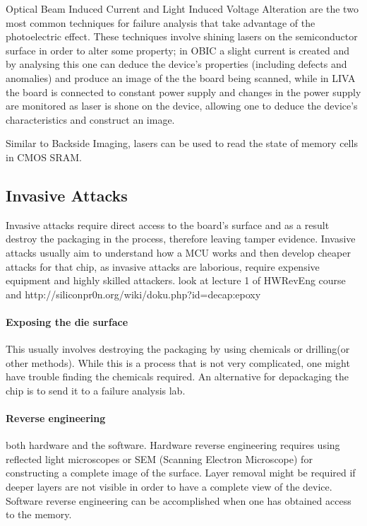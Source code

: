 	Optical Beam Induced Current and Light Induced Voltage Alteration are the two most common techniques for failure analysis that take advantage of the photoelectric effect. These techniques involve shining lasers on the semiconductor surface in order to alter some property; in OBIC a slight current is created and by analysing this one can deduce the device's properties (including defects and anomalies) and produce an image of the the board being scanned, while in LIVA the board is connected to constant power supply and changes in the power supply are monitored as laser is shone on the device, allowing one to deduce the device's characteristics and construct an image\citep{cole:OBIC}.
	
	Similar to Backside Imaging, lasers can be used to read the state of memory cells in CMOS SRAM.
	
	\subsection{Invasive Attacks}
	Invasive attacks require direct access to the board's surface and as a result destroy the packaging in the process, therefore leaving tamper evidence. Invasive attacks usually aim to understand how a MCU works and then develop cheaper attacks for that chip, as invasive attacks are laborious, require expensive equipment and highly skilled attackers. {\color{red} look at lecture 1 of HWRevEng course and http://siliconpr0n.org/wiki/doku.php?id=decap:epoxy}
	
	\paragraph{Exposing the die surface} This usually involves destroying the packaging by using chemicals or drilling(or other methods). While this is a process that is not very complicated\citep{sergei:thesis}, one might have trouble finding the chemicals required. An alternative for depackaging the chip is to send it to a failure analysis lab\citep{website:hacking_the_pic}.
	
	\paragraph{Reverse engineering} both hardware and the software. Hardware reverse engineering requires using reflected light microscopes or SEM (Scanning Electron Microscope) for constructing a complete image of the surface. Layer removal might be required if deeper layers are not visible in order to have a complete view of the device. Software reverse engineering can be accomplished when one has obtained access to the memory.
	
